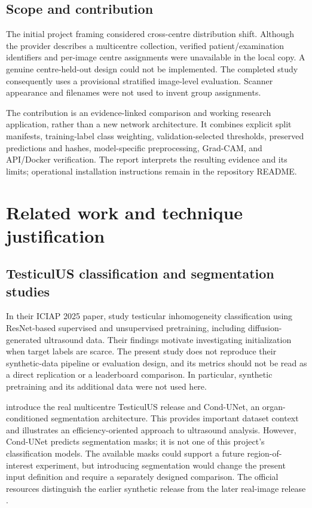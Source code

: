 \documentclass[11pt,a4paper]{article}
\begin{document}
\subsection{Scope and contribution}
The initial project framing considered cross-centre distribution shift. Although the provider describes a multicentre collection, verified patient/examination identifiers and per-image centre assignments were unavailable in the local copy. A genuine centre-held-out design could not be implemented. The completed study consequently uses a provisional stratified image-level evaluation. Scanner appearance and filenames were not used to invent group assignments.

The contribution is an evidence-linked comparison and working research application, rather than a new network architecture. It combines explicit split manifests, training-label class weighting, validation-selected thresholds, preserved predictions and hashes, model-specific preprocessing, Grad-CAM, and API/Docker verification. The report interprets the resulting evidence and its limits; operational installation instructions remain in the repository README.

\section{Related work and technique justification}
\subsection{TesticulUS classification and segmentation studies}
In their ICIAP 2025 paper, \citet{2025ICIAP} study testicular inhomogeneity classification using ResNet-based supervised and unsupervised pretraining, including diffusion-generated ultrasound data. Their findings motivate investigating initialization when target labels are scarce. The present study does not reproduce their synthetic-data pipeline or evaluation design, and its metrics should not be read as a direct replication or a leaderboard comparison. In particular, synthetic pretraining and its additional data were not used here.

\citet{2026BMVC} introduce the real multicentre TesticulUS release and Cond-UNet, an organ-conditioned segmentation architecture. This provides important dataset context and illustrates an efficiency-oriented approach to ultrasound analysis. However, Cond-UNet predicts segmentation masks; it is not one of this project's classification models. The available masks could support a future region-of-interest experiment, but introducing segmentation would change the present input definition and require a separately designed comparison. The official resources distinguish the earlier synthetic release from the later real-image release \citep{dataset}.
\end{document}
